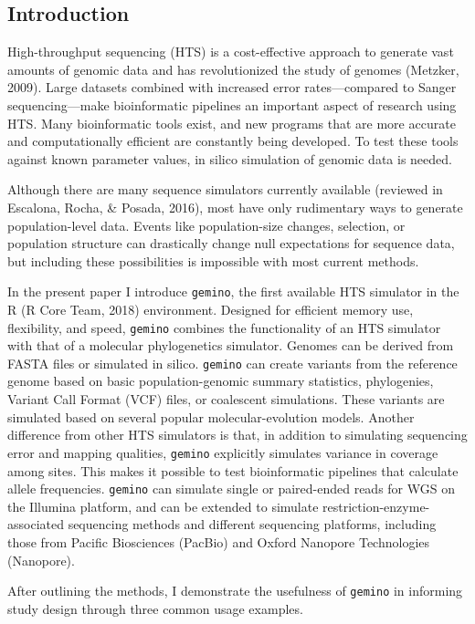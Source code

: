 \documentclass[12pt,]{article}
\begin{document}
\hypertarget{introduction}{%
\subsection{Introduction}\label{introduction}}

High-throughput sequencing (HTS) is a cost-effective approach to
generate vast amounts of genomic data and has revolutionized the study
of genomes (Metzker, 2009). Large datasets combined with increased error
rates---compared to Sanger sequencing---make bioinformatic pipelines an
important aspect of research using HTS. Many bioinformatic tools exist,
and new programs that are more accurate and computationally efficient
are constantly being developed. To test these tools against known
parameter values, in silico simulation of genomic data is needed.

Although there are many sequence simulators currently available
(reviewed in Escalona, Rocha, \& Posada, 2016), most have only
rudimentary ways to generate population-level data. Events like
population-size changes, selection, or population structure can
drastically change null expectations for sequence data, but including
these possibilities is impossible with most current methods.

In the present paper I introduce \texttt{gemino}, the first available
HTS simulator in the R (R Core Team, 2018) environment. Designed for
efficient memory use, flexibility, and speed, \texttt{gemino} combines
the functionality of an HTS simulator with that of a molecular
phylogenetics simulator. Genomes can be derived from FASTA files or
simulated in silico. \texttt{gemino} can create variants from the
reference genome based on basic population-genomic summary statistics,
phylogenies, Variant Call Format (VCF) files, or coalescent simulations.
These variants are simulated based on several popular
molecular-evolution models. Another difference from other HTS simulators
is that, in addition to simulating sequencing error and mapping
qualities, \texttt{gemino} explicitly simulates variance in coverage
among sites. This makes it possible to test bioinformatic pipelines that
calculate allele frequencies. \texttt{gemino} can simulate single or
paired-ended reads for WGS on the Illumina platform, and can be extended
to simulate restriction-enzyme-associated sequencing methods and
different sequencing platforms, including those from Pacific Biosciences
(PacBio) and Oxford Nanopore Technologies (Nanopore).

After outlining the methods, I demonstrate the usefulness of
\texttt{gemino} in informing study design through three common usage
examples.
\end{document}

